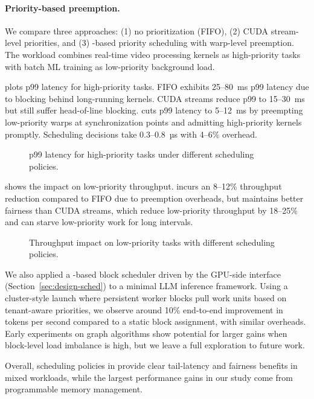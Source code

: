 \paragraph{Priority-based preemption.}
We compare three approaches: (1) no prioritization (FIFO), (2) CUDA stream-level
priorities, and (3) \sys-based priority scheduling with warp-level preemption.
The workload combines real-time video processing kernels as high-priority tasks
with batch ML training as low-priority background load.

 plots p99 latency for high-priority tasks. FIFO exhibits
25--80~ms p99 latency due to blocking behind long-running kernels. CUDA streams
reduce p99 to 15--30~ms but still suffer head-of-line blocking. \sys cuts p99
latency to 5--12~ms by preempting low-priority warps at synchronization points
and admitting high-priority kernels promptly. Scheduling decisions take
0.3--0.8~µs with 4--6\% overhead.

\begin{figure}
\centering
{}
\caption{p99 latency for high-priority tasks under different scheduling policies.}
\label{fig:p99-latency}
\end{figure}

 shows the impact on low-priority throughput.
\sys incurs an 8--12\% throughput reduction compared to FIFO due to preemption
overheads, but maintains better fairness than CUDA streams, which reduce
low-priority throughput by 18--25\% and can starve low-priority work for long
intervals.

\begin{figure}
\centering
{}
\caption{Throughput impact on low-priority tasks with different scheduling policies.}
\label{fig:lowprio-throughput}
\end{figure}

We also applied a \sys-based block scheduler driven by the GPU-side interface
(Section~\ref{sec:design-sched}) to a minimal LLM inference framework. Using a
cluster-style launch where persistent worker blocks pull work units based on
tenant-aware priorities, we observe around 10\% end-to-end improvement in tokens
per second compared to a static block assignment, with similar overheads. Early
experiments on graph algorithms show potential for larger gains when block-level
load imbalance is high, but we leave a full exploration to future work.

Overall, scheduling policies in \sys provide clear tail-latency and fairness
benefits in mixed workloads, while the largest performance gains in our study
come from programmable memory management.
